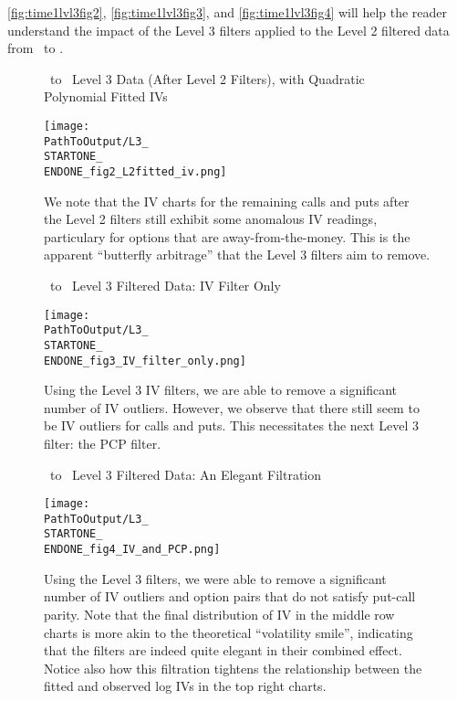 \autoref{fig:time1lvl3fig2}, \autoref{fig:time1lvl3fig3}, and \autoref{fig:time1lvl3fig4} will help the reader understand the impact of the Level 3 filters applied to the Level 2 filtered data from \STARTONE\ to \ENDONE.

\begin{figure}[htbp]
  \centering
  \caption{\STARTONE\ to \ENDONE\ Level 3 Data (After Level 2 Filters), with Quadratic Polynomial Fitted IVs}
  \texttt{[image: \\PathToOutput/L3\_\\STARTONE\_\\ENDONE\_fig2\_L2fitted\_iv.png]}
  \caption*{We note that the IV charts for the remaining calls and puts after the Level 2 filters still exhibit some anomalous IV readings, particulary for options that are away-from-the-money. This is the apparent ``butterfly arbitrage'' that the Level 3 filters aim to remove.}
  \label{fig:time1lvl3fig2}
\end{figure}
\clearpage


\begin{figure}[htbp]
  \centering
  \caption{\STARTONE\ to \ENDONE\ Level 3 Filtered Data: IV Filter Only}
  \texttt{[image: \\PathToOutput/L3\_\\STARTONE\_\\ENDONE\_fig3\_IV\_filter\_only.png]}
  \caption*{Using the Level 3 IV filters, we are able to remove a significant number of IV outliers. However, we observe that there still seem to be IV outliers for calls and puts. This necessitates the next Level 3 filter: the PCP filter.}
  \label{fig:time1lvl3fig3}
\end{figure}

\clearpage


\begin{figure}[htbp]
  \centering
  \caption{\STARTONE\ to \ENDONE\ Level 3 Filtered Data: An Elegant Filtration}
  \texttt{[image: \\PathToOutput/L3\_\\STARTONE\_\\ENDONE\_fig4\_IV\_and\_PCP.png]}
  \caption*{Using the Level 3 filters, we were able to remove a significant number of IV outliers and option pairs that do not satisfy put-call parity. Note that the final distribution of IV in the middle row charts is more akin to the theoretical ``volatility smile'', indicating that the filters are indeed quite elegant in their combined effect. Notice also how this filtration tightens the relationship between the fitted and observed log IVs in the top right charts.}
  \label{fig:time1lvl3fig4}
\end{figure}

